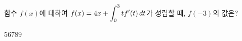 함수 $f(x)$에 대하여 $f(x)=4x+\displaystyle\int_{0}^{3}tf'(t)\mkern3mu dt$가 성립할 때, $f(-3)$의 값은?
\begin{choices32}{$5$}{$6$}{$7$}{$8$}{$9$}\end{choices32}
